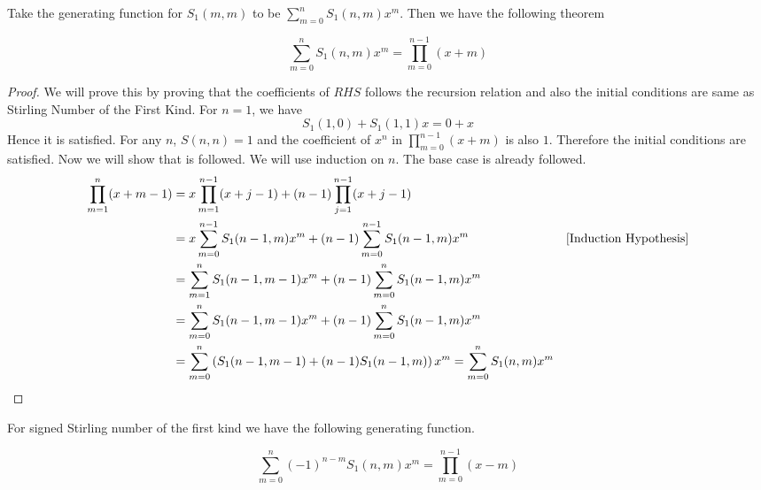 \documentclass[twoside]{article}
\begin{document}
Take the generating function for $S_1(m,m)$ to be $\sum\limits_{m=0}^nS_1(n,m)x^m$. Then we have the following theorem
\begin{Theorem}{}{}
	$$\sum\limits_{m=0}^nS_1(n,m)x^m=\prod_{m=0}^{n-1}(x+m)$$
\end{Theorem}
\begin{proof}
	We will prove this by proving that the coefficients of $RHS$ follows the recursion relation   and also the initial conditions are same as Stirling Number of the First Kind. For $n=1$, we have $$S_1(1,0)+S_1(1,1)x=0+x$$Hence it is satisfied. For any $n$, $S(n,n)=1$ and the coefficient of $x^n$ in $\prod_{m=0}^{n-1}(x+m)$ is also $1$. Therefore the initial conditions are satisfied. Now we will show that  is followed. We will use induction on $n$. The base case is already followed. \begin{align*}
		\prod_{m=1}^{n}(x+m-1) & = x\prod_{m=1}^{n-1}(x+j-1)+(n-1)\prod_{j=1}^{n-1}(x+j-1)\\
		& = x\sum_{m=0}^{n-1}S_1(n-1,m)x^{m}+(n-1)\sum_{m=0}^{n-1}S_1(n-1,m)x^m & [\text{Induction Hypothesis}]\\
		& = \sum_{m=1}^{n}S_1(n-1,m-1)x^{m}+(n-1)\sum_{m=0}^{n}S_1(n-1,m)x^m\\
		& = \sum_{m=0}^{n}S_1(n-1,m-1)x^{m}+(n-1)\sum_{m=0}^{n}S_1(n-1,m)x^m\\
		& = \sum_{m=0}^n\left(S_1(n-1,m-1)+(n-1)S_1(n-1,m)\right)x^m= \sum_{m=0}^nS_1(n,m)x^m
	\end{align*}
\end{proof}
For signed Stirling number of the first kind we have the following generating function. 
\begin{Theorem}{}{}
	$$\sum\limits_{m=0}^n(-1)^{n-m}S_1(n,m)x^m=\prod_{m=0}^{n-1}(x-m)$$
\end{Theorem}
\end{document}
